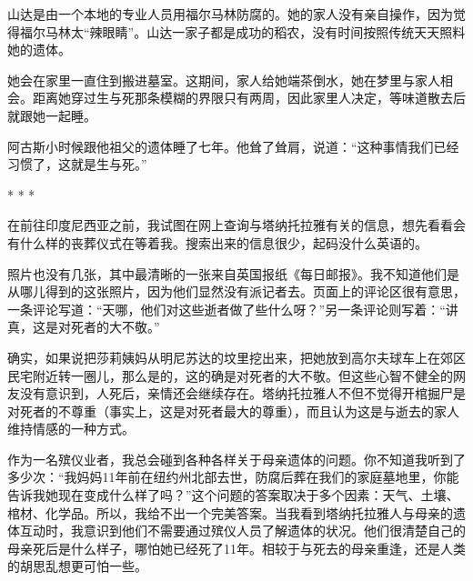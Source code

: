 \documentclass[12pt,oneside]{book}
\begin{document}
\begin{bookref}[frametitle={\cite{好好告别：世界葬礼观察手记}}]
山达是由一个本地的专业人员用福尔马林防腐的。她的家人没有亲自操作，因为觉得福尔马林太“辣眼睛”。山达一家子都是成功的稻农，没有时间按照传统天天照料她的遗体。

她会在家里一直住到搬进墓室。这期间，家人给她端茶倒水，她在梦里与家人相会。距离她穿过生与死那条模糊的界限只有两周，因此家里人决定，等味道散去后就跟她一起睡。

阿古斯小时候跟他祖父的遗体睡了七年。他耸了耸肩，说道：“这种事情我们已经习惯了，这就是生与死。”

\begin{center}
* * *
\end{center}

在前往印度尼西亚之前，我试图在网上查询与塔纳托拉雅有关的信息，想先看看会有什么样的丧葬仪式在等着我。搜索出来的信息很少，起码没什么英语的。

照片也没有几张，其中最清晰的一张来自英国报纸《每日邮报》。我不知道他们是从哪儿得到的这张照片，因为他们显然没有派记者去。页面上的评论区很有意思，一条评论写道：“天哪，他们对这些逝者做了些什么呀？”另一条评论则写着：“讲真，这是对死者的大不敬。”

确实，如果说把莎莉姨妈从明尼苏达的坟里挖出来，把她放到高尔夫球车上在郊区民宅附近转一圈儿，那么是的，这的确是对死者的大不敬。但这些心智不健全的网友没有意识到，人死后，亲情还会继续存在。塔纳托拉雅人不但不觉得开棺掘尸是对死者的不尊重（事实上，这是对死者最大的尊重），而且认为这是与逝去的家人维持情感的一种方式。

作为一名殡仪业者，我总会碰到各种各样关于母亲遗体的问题。你不知道我听到了多少次：“我妈妈11年前在纽约州北部去世，防腐后葬在我们的家庭墓地里，你能告诉我她现在变成什么样了吗？”这个问题的答案取决于多个因素：天气、土壤、棺材、化学品。所以，我给不出一个完美答案。当我看到塔纳托拉雅人与母亲的遗体互动时，我意识到他们不需要通过殡仪人员了解遗体的状况。他们很清楚自己的母亲死后是什么样子，哪怕她已经死了11年。相较于与死去的母亲重逢，还是人类的胡思乱想更可怕一些。


\end{bookref}
\end{document}
